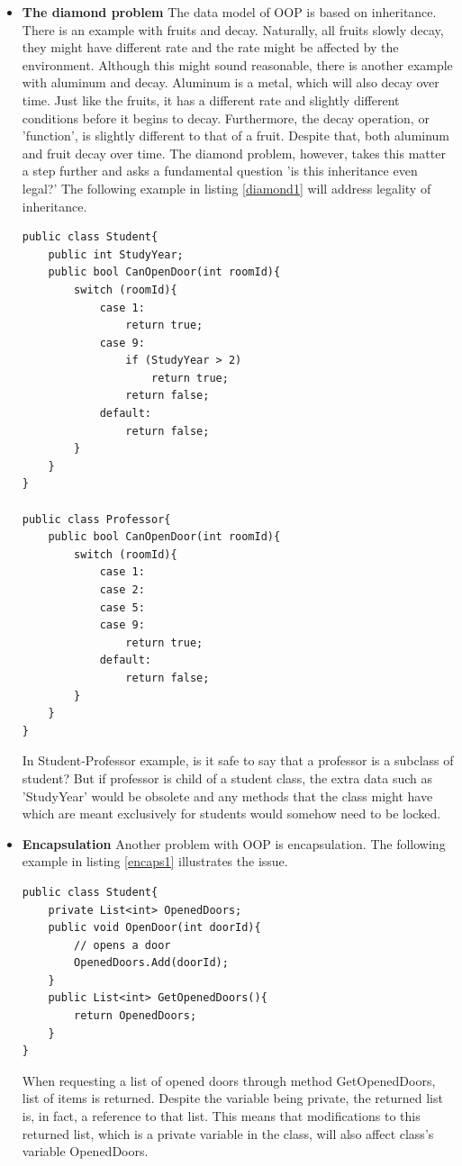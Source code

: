 \documentclass{article}
\begin{document}
\begin{itemize}
    \item \textbf{The diamond problem} \newline
          The data model of OOP is based on inheritance. There is an example with fruits and decay. Naturally, all fruits slowly decay, they might have different rate and the rate might be affected by the environment. Although this might sound reasonable, there is another example with aluminum and decay. Aluminum is a metal, which will also decay over time. Just like the fruits, it has a different rate and slightly different conditions before it begins to decay. Furthermore, the decay operation, or 'function', is slightly different to that of a fruit. Despite that, both aluminum and fruit decay over time.
          The diamond problem, however, takes this matter a step further and asks a fundamental question 'is this inheritance even legal?'
          The following example in listing \ref*{diamond1} will address legality of inheritance.
          \newpage
          \begin{lstlisting}[frame=single, label=diamond1, caption=Inheritance Problem]
public class Student{
    public int StudyYear;
    public bool CanOpenDoor(int roomId){
        switch (roomId){
            case 1:
                return true;
            case 9:
                if (StudyYear > 2)
                    return true;
                return false;
            default:
                return false;
        }
    }
}

public class Professor{
    public bool CanOpenDoor(int roomId){
        switch (roomId){
            case 1:
            case 2:
            case 5:
            case 9:
                return true;
            default:
                return false;
        }
    }
}
    \end{lstlisting}
          In Student-Professor example, is it safe to say that a professor is a subclass of student? But if professor is child of a student class, the extra data such as 'StudyYear' would be obsolete and any methods that the class might have which are meant exclusively for students would somehow need to be locked.
    \item \textbf{Encapsulation} \newline
          Another problem with OOP is encapsulation. The following example in listing \ref*{encaps1} illustrates the issue.
          \begin{lstlisting}[frame=single, label=encaps1, caption=Encapsulation Problem]
public class Student{
    private List<int> OpenedDoors;
    public void OpenDoor(int doorId){
        // opens a door
        OpenedDoors.Add(doorId);
    }
    public List<int> GetOpenedDoors(){
        return OpenedDoors;
    }
}
    \end{lstlisting}
          When requesting a list of opened doors through method GetOpenedDoors, list of items is returned. Despite the variable being private, the returned list is, in fact, a reference to that list. This means that modifications to this returned list, which is a private variable in the class, will also affect class's variable OpenedDoors.
\end{itemize}
\end{document}

